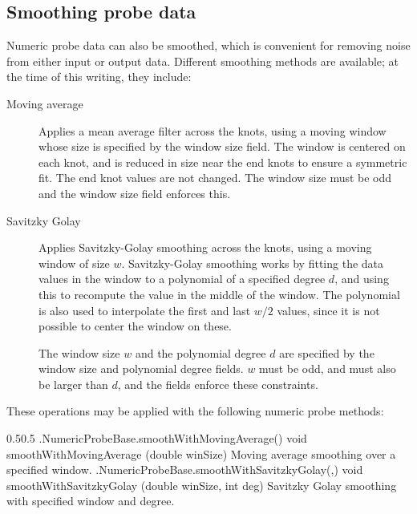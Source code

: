 \subsection{Smoothing probe data}
\label{SmoothingProbeData:sec}

Numeric probe data can also be smoothed, which is convenient for removing noise
from either input or output data. Different smoothing methods are available; at
the time of this writing, they include:

\begin{description}

\item[Moving average] \mbox{}

Applies a mean average filter across the knots, using a moving window
whose size is specified by the {\sf window size} field. The window is
centered on each knot, and is reduced in size near the end knots to
ensure a symmetric fit. The end knot values are not changed.  The
window size must be odd and the {\sf window size} field enforces this.

\item[Savitzky Golay] \mbox{}

Applies Savitzky-Golay smoothing across the knots, using a moving
window of size $w$.  Savitzky-Golay smoothing works by fitting the
data values in the window to a polynomial of a specified degree $d$, and
using this to recompute the value in the middle of the window.  The
polynomial is also used to interpolate the first and last $w/2$
values, since it is not possible to center the window on these.

The window size $w$ and the polynomial degree $d$ are specified by the
{\sf window size} and {\sf polynomial degree} fields. $w$ must be odd,
and must also be larger than $d$, and the fields enforce these
constraints.

\end{description}

These operations may be applied with the following numeric probe
methods:

%
\begin{methodtable}{0.5}{0.5}
\midline
%
\methodentry
{\probes.NumericProbeBase.smoothWithMovingAverage()}%
{void smoothWithMovingAverage (double winSize)}%
{Moving average smoothing over a specified window.}%
%
\methodentry
{\probes.NumericProbeBase.smoothWithSavitzkyGolay(,)}%
{void smoothWithSavitzkyGolay (\brh double winSize, int deg)}%
{Savitzky Golay smoothing with specified window and degree.}%
%
\midline
\end{methodtable}
%

%
\ifdefined\maindoc
\else

\fi

